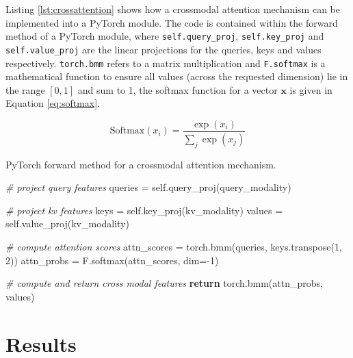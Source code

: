\documentclass[twocolumn]{article}
\newenvironment{Shaded}{}{}
\newcommand{\CommentTok}[1]{\textcolor[rgb]{0.38,0.63,0.69}{\textit{#1}}}
\newcommand{\ControlFlowTok}[1]{\textcolor[rgb]{0.00,0.44,0.13}{\textbf{#1}}}
\newcommand{\DecValTok}[1]{\textcolor[rgb]{0.25,0.63,0.44}{#1}}
\newcommand{\NormalTok}[1]{#1}
\newcommand{\OperatorTok}[1]{\textcolor[rgb]{0.40,0.40,0.40}{#1}}
\newcommand{\VariableTok}[1]{\textcolor[rgb]{0.10,0.09,0.49}{#1}}
\begin{document}
Listing \ref{lst:crossattention} shows how a crossmodal attention
mechanism can be implemented into a PyTorch module. The code is
contained within the forward method of a PyTorch module, where
\texttt{self.query\_proj}, \texttt{self.key\_proj} and
\texttt{self.value\_proj} are the linear projections for the queries,
keys and values respectively. \texttt{torch.bmm} refers to a matrix
multiplication and \texttt{F.softmax} is a mathematical function to
ensure all values (across the requested dimension) lie in the range
\([0,1]\) and sum to 1, the softmax function for a vector \(\mathbf{x}\)
is given in Equation \ref{eq:softmax}.

\begin{equation} \text{Softmax}(x_i) = \frac{\exp(x_i)}{\sum_j \exp(x_j)} \label{eq:softmax}\end{equation}

\begin{codelisting}[H]

\caption{PyTorch forward method for a crossmodal attention mechanism.}\label{lst:crossattention}

\begin{Shaded}
\begin{Highlighting}[numbers=left,,]
\CommentTok{\# project query features}
\NormalTok{queries }\OperatorTok{=} \VariableTok{self}\NormalTok{.query\_proj(query\_modality)}

\CommentTok{\# project kv features}
\NormalTok{keys }\OperatorTok{=} \VariableTok{self}\NormalTok{.key\_proj(kv\_modality)}
\NormalTok{values }\OperatorTok{=} \VariableTok{self}\NormalTok{.value\_proj(kv\_modality)}

\CommentTok{\# compute attention scores}
\NormalTok{attn\_scores }\OperatorTok{=}\NormalTok{ torch.bmm(queries, keys.transpose(}\DecValTok{1}\NormalTok{, }\DecValTok{2}\NormalTok{))}
\NormalTok{attn\_probs }\OperatorTok{=}\NormalTok{ F.softmax(attn\_scores, dim}\OperatorTok{={-}}\DecValTok{1}\NormalTok{)}

\CommentTok{\# compute and return cross modal features}
\ControlFlowTok{return}\NormalTok{ torch.bmm(attn\_probs, values)}
\end{Highlighting}
\end{Shaded}

\end{codelisting}

\section{Results}\label{results}
\end{document}
